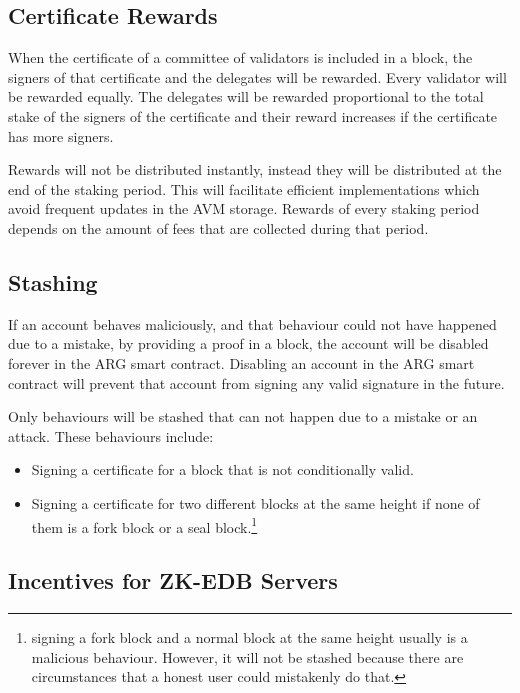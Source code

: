 

\subsection{Certificate Rewards}\label{subsec:rewards}

When the certificate of a committee of validators is included in a block, the signers of that certificate and the
delegates will be rewarded. Every validator will be rewarded equally. The delegates will be rewarded
proportional to the total stake of the signers of the certificate and their reward increases if the
certificate has more signers.

Rewards will not be distributed instantly, instead they will be distributed at the end of the staking period.
This will facilitate efficient implementations which avoid frequent updates in the AVM storage.
Rewards of every staking period depends on the amount of fees that are collected during that period.

\subsection{Stashing}\label{subsec:stashing}

If an account behaves maliciously, and that behaviour could not have happened due to a mistake, by providing a proof
in a block, the account will be disabled forever in the ARG smart contract. Disabling an account in the
ARG smart contract will prevent that account from signing any valid signature in the future.

Only behaviours will be stashed that can not happen due to a mistake or an attack. These behaviours include:
\begin{itemize}
    \item Signing a certificate for a block that is not conditionally valid.
    \item Signing a certificate for two different blocks at the same height if none of them
    is a fork block or a seal block.\footnote{signing
    a fork block and a normal block at the same height usually is a malicious behaviour. However, it will not be
    stashed because there are circumstances that a honest user could mistakenly do that.}
\end{itemize}

\subsection{Incentives for ZK-EDB Servers}\label{subsec:zk-edb-servers}

